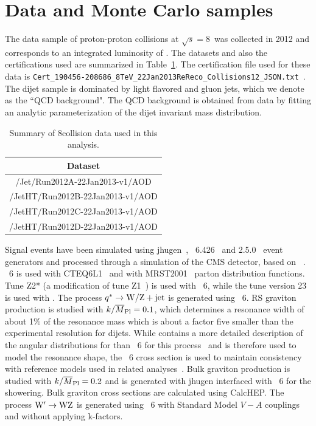 \newpage
\section{Data and Monte Carlo samples}
\label{sec:data_and_mc_samples1}


The data sample of proton-proton collisions at $\sqrt{s}=8$~\TeVcc was collected in 2012 and corresponds to
an integrated luminosity of \intlumi.
The datasets and also the certifications
used are summarized in Table~\ref{table:dataset}. 
The certification file used for these data is 
{\tt Cert\_190456-208686\_8TeV\_22Jan2013ReReco\_Collisions12\_JSON.txt
}. The dijet sample is dominated by light flavored and gluon jets, which we denote as 
the ``QCD background".  The QCD background is obtained from data by fitting an
analytic parameterization of the dijet invariant mass distribution.

\begin{table}[!htb]
\begin{center}
\begin{tabular}{c}
\hline
Dataset                                 \\
\hline
/Jet/Run2012A-22Jan2013-v1/AOD  \\
/JetHT/Run2012B-22Jan2013-v1/AOD  \\
/JetHT/Run2012C-22Jan2013-v1/AOD  \\
/JetHT/Run2012D-22Jan2013-v1/AOD  \\
\hline
\end{tabular} 
\end{center}
\caption{Summary of 8\TeVcc collision data used in this analysis. 
}
\label{table:dataset}
\end{table}



Signal events have been simulated using
{\sc jhugen}~\cite{Gao:2010qx,Bolognesi:2012mm},
\PYTHIA~6.426~\cite{pythia} and \HERWIG{++} 2.5.0~\cite{herwig} event
generators and processed through a simulation of the CMS detector,
based on \GEANTfour~\cite{refGEANT}.  \PYTHIA~6 is used with
CTEQ6L1~\cite{cteq} and \HERWIG{++} with MRST2001~\cite{mrst} parton
distribution functions.  Tune Z2* (a modification of tune
Z1~\cite{bib_tunez1}) is used with \PYTHIA~6, while the tune version
23 is used with \HERWIG{++}.  The process $q^* \to {\rm W}/{\rm Z} +
\text{jet}$ is generated using \PYTHIA~6.  RS graviton production is
studied with $k/\overline{M}_\text{Pl}=0.1$, which determines a resonance width of about
1\% of the resonance mass which is about a factor five smaller than
the experimental resolution for dijets.  While \HERWIG{++} contains a
more detailed description of the angular distributions for \GRS than
\PYTHIA~6 for this process~\cite{resonanceshape} and is therefore used
to model the \GRS resonance shape, the \PYTHIA~6 cross section is used
to maintain consistency with reference models used in related
analyses~\cite{CMSZZPAS2}.  Bulk graviton production is studied with
$k/\overline{M}_\text{Pl}=0.2$ and is generated with {\sc jhugen} interfaced with
\PYTHIA~6 for the showering.
Bulk graviton cross sections are calculated using CalcHEP.
The process $\mathrm{W}^{\prime} \to {\rm W}{\rm Z}$ is generated using \PYTHIA~6 with Standard
Model $V-A$ couplings and without applying k-factors.  

